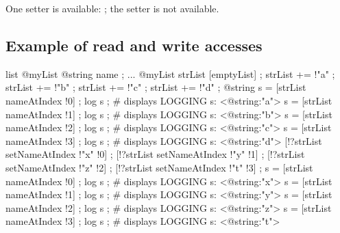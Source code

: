 One setter is available: ; the  setter is not available.

\subsection{Example of read and write accesses}

\begin{galgascode}
list @myList {
  @string name ;
}
...
@myList strList [emptyList] ;
strList += !"a" ;
strList += !"b" ;
strList += !"c" ;
strList += !"d" ;
@string s = [strList nameAtIndex !0] ;
log s ; # displays LOGGING s: <@string:"a">
s = [strList nameAtIndex !1] ;
log s ; # displays LOGGING s: <@string:"b">
s = [strList nameAtIndex !2] ;
log s ; # displays LOGGING s: <@string:"c">
s = [strList nameAtIndex !3] ;
log s ; # displays LOGGING s: <@string:"d">
[!?strList setNameAtIndex !"x" !0] ;
[!?strList setNameAtIndex !"y" !1] ;
[!?strList setNameAtIndex !"z" !2] ;
[!?strList setNameAtIndex !"t" !3] ;
s = [strList nameAtIndex !0] ;
log s ; # displays LOGGING s: <@string:"x">
s = [strList nameAtIndex !1] ;
log s ; # displays LOGGING s: <@string:"y">
s = [strList nameAtIndex !2] ;
log s ; # displays LOGGING s: <@string:"z">
s = [strList nameAtIndex !3] ;
log s ; # displays LOGGING s: <@string:"t">
\end{galgascode}
